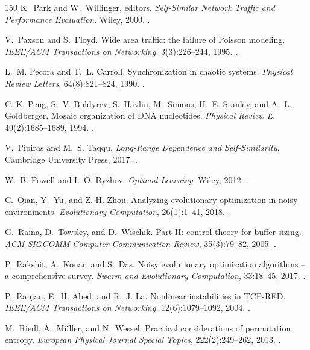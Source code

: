 \begin{thebibliography}{150}
K.~Park and W.~Willinger, editors. \emph{Self-Similar Network Traffic and Performance Evaluation}. Wiley, 2000. .

V.~Paxson and S.~Floyd. Wide area traffic: the failure of Poisson modeling. \emph{IEEE/ACM Transactions on Networking}, 3(3):226--244, 1995. .

L.~M. Pecora and T.~L. Carroll. Synchronization in chaotic systems. \emph{Physical Review Letters}, 64(8):821--824, 1990. .

C.-K. Peng, S.~V. Buldyrev, S.~Havlin, M.~Simons, H.~E. Stanley, and A.~L. Goldberger. Mosaic organization of DNA nucleotides. \emph{Physical Review E}, 49(2):1685--1689, 1994. .

V.~Pipiras and M.~S. Taqqu. \emph{Long-Range Dependence and Self-Similarity}. Cambridge University Press, 2017. .

W.~B. Powell and I.~O. Ryzhov. \emph{Optimal Learning}. Wiley, 2012. .

C.~Qian, Y.~Yu, and Z.-H. Zhou. Analyzing evolutionary optimization in noisy environments. \emph{Evolutionary Computation}, 26(1):1--41, 2018. .

G.~Raina, D.~Towsley, and D.~Wischik. Part II: control theory for buffer sizing. \emph{ACM SIGCOMM Computer Communication Review}, 35(3):79--82, 2005. .

P.~Rakshit, A.~Konar, and S.~Das. Noisy evolutionary optimization algorithms -- a comprehensive survey. \emph{Swarm and Evolutionary Computation}, 33:18--45, 2017. .

P.~Ranjan, E.~H. Abed, and R.~J. La. Nonlinear instabilities in TCP-RED. \emph{IEEE/ACM Transactions on Networking}, 12(6):1079--1092, 2004. .

M.~Riedl, A.~M{\"u}ller, and N.~Wessel. Practical considerations of permutation entropy. \emph{European Physical Journal Special Topics}, 222(2):249--262, 2013. .


\end{thebibliography}
